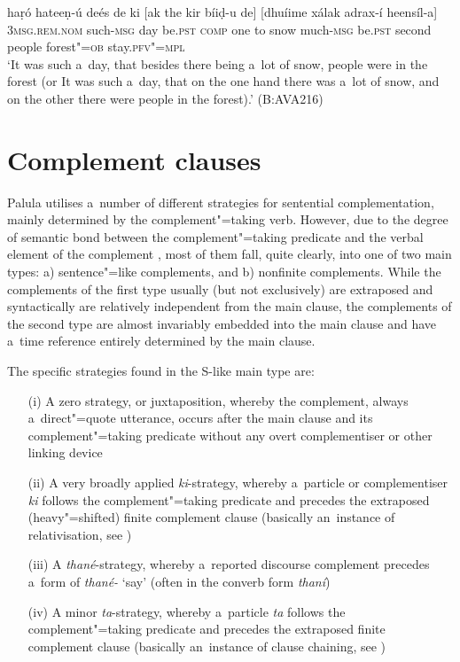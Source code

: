 \begin{exe}
\ex
\label{ex:13-126}
\gll haṛó hateeṇ-ú deés de ki [ak  the kir bíiḍ-u de] [dhuíime xálak  adrax-í heensíl-a] \\
\textsc{3msg.rem.nom} such-\textsc{msg}  day be.\textsc{pst} \textsc{comp} one  to snow much-\textsc{msg} be.\textsc{pst} second people  forest"=\textsc{ob} stay.\textsc{pfv"=mpl} \\
\glt `It was such a~day, that besides there being a~lot of snow, people were in the forest (or It was such a~day, that on the one hand there was a~lot of snow, and on the other there were people in the forest).' (B:AVA216)
\end{exe}

\section{Complement clauses}
\label{sec:13-5}

Palula utilises a~number of different strategies for sentential complementation, mainly determined by the complement"=taking verb. However, due to the degree of semantic bond between the complement"=taking predicate and the verbal element of the complement \citep[39-40]{givon2001b}, most of them fall, quite clearly, into one of two main types: a) sentence"=like complements, and b) nonfinite complements. While the complements of the first type usually (but not exclusively) are extraposed and syntactically are relatively independent from the main clause, the complements of the second type are almost invariably embedded into the main clause and have a~time reference entirely determined by the main clause.

The specific strategies found in the S-like main type are:

\begin{enumerate}
\item[(i)] A zero strategy, or juxtaposition, whereby the complement, always a~direct"=quote utterance, occurs after the main clause and its complement"=taking predicate without any overt complementiser or other linking device
\item[(ii)] A very broadly applied \textit{ki}-strategy, whereby a~particle or complementiser \textit{ki} follows the complement"=taking predicate and precedes the extraposed (heavy"=shifted) finite complement clause (basically an~instance of relativisation, see )
\item[(iii)] A \textit{thané}-strategy, whereby a~reported discourse complement precedes a~form of \textit{thané-} `say' (often in the converb form \textit{thaní})
\item[(iv)] A minor \textit{ta}-strategy, whereby a~particle \textit{ta} follows the complement"=taking predicate and precedes the extraposed finite complement clause (basically an~instance of clause chaining, see )
\end{enumerate}

